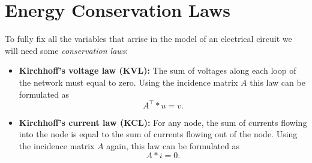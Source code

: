 \section{Energy Conservation Laws}
To fully fix all the variables that arrise in the model of an electrical circuit we will need some \emph{conservation laws}:
\begin{itemize}
	\item \textbf{Kirchhoff's voltage law (KVL):} \newline
	The sum of voltages along each loop of the network must equal to zero. Using the incidence matrix $A$ this law can be formulated as
	\begin{equation}
		\label{KVL}
		A^\top * u = v.
	\end{equation}
	\item \textbf{Kirchhoff's current law (KCL):} \newline
	For any node, the sum of currents flowing into the node is equal to the sum of currents flowing out of the node. Using the incidence matrix $A$ again, this law can be formulated as
	\begin{equation}
		\label{KCL}
		A * i = 0.
	\end{equation}
\end{itemize}

